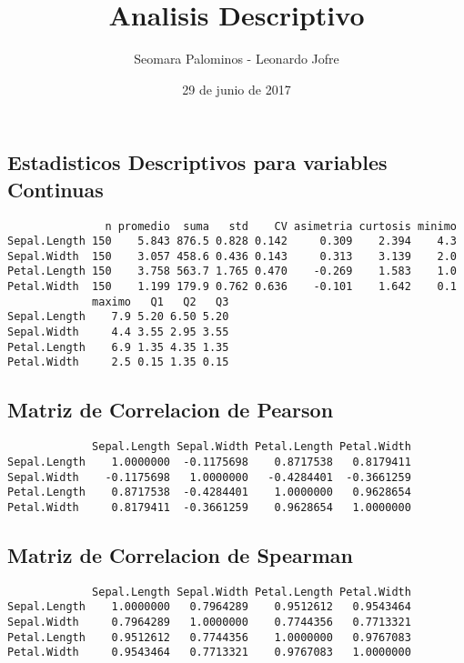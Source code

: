 \documentclass[]{article}
\title{Analisis Descriptivo}
\author{Seomara Palominos - Leonardo Jofre}
\date{29 de junio de 2017}
\begin{document}
\maketitle

\subsection{Estadisticos Descriptivos para variables
Continuas}\label{estadisticos-descriptivos-para-variables-continuas}

\begin{verbatim}
               n promedio  suma   std    CV asimetria curtosis minimo
Sepal.Length 150    5.843 876.5 0.828 0.142     0.309    2.394    4.3
Sepal.Width  150    3.057 458.6 0.436 0.143     0.313    3.139    2.0
Petal.Length 150    3.758 563.7 1.765 0.470    -0.269    1.583    1.0
Petal.Width  150    1.199 179.9 0.762 0.636    -0.101    1.642    0.1
             maximo   Q1   Q2   Q3
Sepal.Length    7.9 5.20 6.50 5.20
Sepal.Width     4.4 3.55 2.95 3.55
Petal.Length    6.9 1.35 4.35 1.35
Petal.Width     2.5 0.15 1.35 0.15
\end{verbatim}

\subsection{Matriz de Correlacion de
Pearson}\label{matriz-de-correlacion-de-pearson}

\begin{verbatim}
             Sepal.Length Sepal.Width Petal.Length Petal.Width
Sepal.Length    1.0000000  -0.1175698    0.8717538   0.8179411
Sepal.Width    -0.1175698   1.0000000   -0.4284401  -0.3661259
Petal.Length    0.8717538  -0.4284401    1.0000000   0.9628654
Petal.Width     0.8179411  -0.3661259    0.9628654   1.0000000
\end{verbatim}

\subsection{Matriz de Correlacion de
Spearman}\label{matriz-de-correlacion-de-spearman}

\begin{verbatim}
             Sepal.Length Sepal.Width Petal.Length Petal.Width
Sepal.Length    1.0000000   0.7964289    0.9512612   0.9543464
Sepal.Width     0.7964289   1.0000000    0.7744356   0.7713321
Petal.Length    0.9512612   0.7744356    1.0000000   0.9767083
Petal.Width     0.9543464   0.7713321    0.9767083   1.0000000
\end{verbatim}
\end{document}
